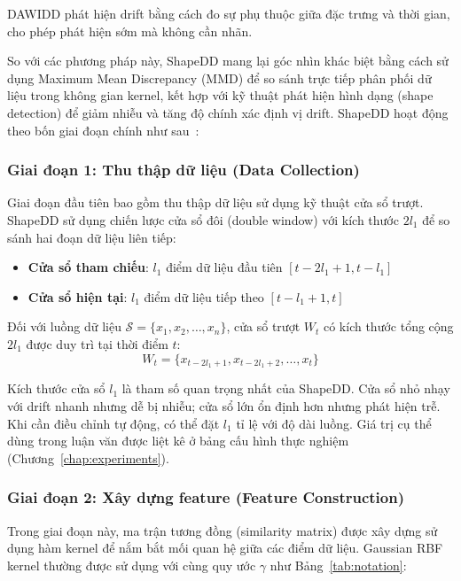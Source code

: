 DAWIDD phát hiện drift bằng cách đo sự phụ thuộc giữa đặc trưng và thời gian, cho phép phát hiện sớm mà không cần nhãn.

So với các phương pháp này, ShapeDD mang lại góc nhìn khác biệt bằng cách sử dụng Maximum Mean Discrepancy (MMD) để so sánh trực tiếp phân phối dữ liệu trong không gian kernel, kết hợp với kỹ thuật phát hiện hình dạng (shape detection) để giảm nhiễu và tăng độ chính xác định vị drift.
ShapeDD hoạt động theo bốn giai đoạn chính như sau~\cite{shapeDD2021}:

\subsubsection{Giai đoạn 1: Thu thập dữ liệu (Data Collection)}

Giai đoạn đầu tiên bao gồm thu thập dữ liệu sử dụng kỹ thuật cửa sổ trượt. ShapeDD sử dụng chiến lược cửa sổ đôi (double window) với kích thước $2l_1$ để so sánh hai đoạn dữ liệu liên tiếp:

\begin{itemize}
	\item \textbf{Cửa sổ tham chiếu}: $l_1$ điểm dữ liệu đầu tiên $[t-2l_1+1, t-l_1]$
	\item \textbf{Cửa sổ hiện tại}: $l_1$ điểm dữ liệu tiếp theo $[t-l_1+1, t]$
\end{itemize}

Đối với luồng dữ liệu $\mathcal{S} = \{x_1, x_2, \ldots, x_n\}$, cửa sổ trượt $W_t$ có kích thước tổng cộng $2l_1$ được duy trì tại thời điểm $t$:
\begin{equation}
	W_t = \{x_{t-2l_1+1}, x_{t-2l_1+2}, \ldots, x_t\}
\end{equation}

Kích thước cửa sổ $l_1$ là tham số quan trọng nhất của ShapeDD. Cửa sổ nhỏ nhạy với drift nhanh nhưng dễ bị nhiễu; cửa sổ lớn ổn định hơn nhưng phát hiện trễ. Khi cần điều chỉnh tự động, có thể đặt $l_1$ tỉ lệ với độ dài luồng. Giá trị cụ thể dùng trong luận văn được liệt kê ở bảng cấu hình thực nghiệm (Chương~\ref{chap:experiments}).

\subsubsection{Giai đoạn 2: Xây dựng feature (Feature Construction)}

Trong giai đoạn này, ma trận tương đồng (similarity matrix) được xây dựng sử dụng hàm kernel để nắm bắt mối quan hệ giữa các điểm dữ liệu. Gaussian RBF kernel thường được sử dụng với cùng quy ước $\gamma$ như Bảng~\ref{tab:notation}:

